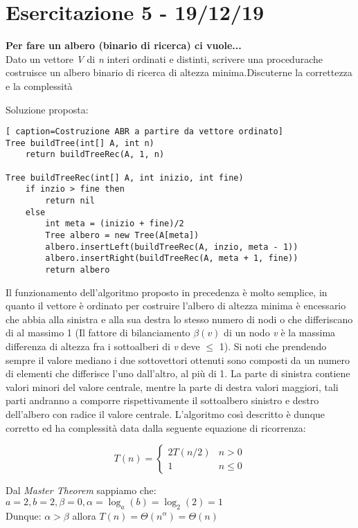 \documentclass[../cheatSheetAlgoritmi.tex]{subfiles}
\begin{document}
\section{Esercitazione 5 - 19/12/19}
\textbf{Per fare un albero (binario di ricerca) ci vuole...}\\
Dato un vettore \textit{V} di \textit{n} interi ordinati e distinti, scrivere una procedurache costruisce un albero binario di ricerca di altezza minima.Discuterne la correttezza e la complessità

\bigskip
Soluzione proposta:
\begin{lstlisting}[ caption=Costruzione ABR a partire da vettore ordinato]
Tree buildTree(int[] A, int n)
	return buildTreeRec(A, 1, n)

Tree buildTreeRec(int[] A, int inizio, int fine)
	if inzio > fine then 
    	return nil
  	else
    	int meta = (inizio + fine)/2
    	Tree albero = new Tree(A[meta])
    	albero.insertLeft(buildTreeRec(A, inzio, meta - 1))
    	albero.insertRight(buildTreeRec(A, meta + 1, fine))
    	return albero
\end{lstlisting}
Il funzionamento dell'algoritmo proposto in precedenza è molto semplice, in quanto il vettore è ordinato per costruire l'albero di altezza minima è encessario che abbia alla sinistra e alla sua destra lo stesso numero di nodi o che differiscano di al massimo 1 (Il fattore di bilanciamento $\beta(v)$ di un nodo \textit{v} è la massima differenza
di altezza fra i sottoalberi di \textit{v} deve $\leq$ 1). Si noti che prendendo sempre il valore mediano i due sottovettori ottenuti sono composti da un numero di elementi che differisce l'uno dall'altro, al più di 1. La parte di sinistra contiene valori minori del valore centrale, mentre la parte di destra valori maggiori, tali parti andranno a comporre rispettivamente il sottoalbero sinistro e destro dell'albero con radice il valore centrale.
L'algoritmo così descritto è dunque corretto ed ha complessità data dalla seguente equazione di ricorrenza:
\begin{center}
	\begin{equation*}
  		T(n)=\begin{cases}
    		2T(n/2)  & \text{$n > 0$}\\
    		1 & \text{$n \leq 0$}
  		\end{cases}
	\end{equation*}
\end{center}
Dal \textit{Master Theorem} sappiamo che:\\
$a = 2, b = 2, \beta = 0, \alpha = \log_a(b) = \log_2(2) = 1$\\
Dunque: $\alpha > \beta$ allora $T(n) = \Theta(n^\alpha) = \Theta(n)$ 
\end{document}
